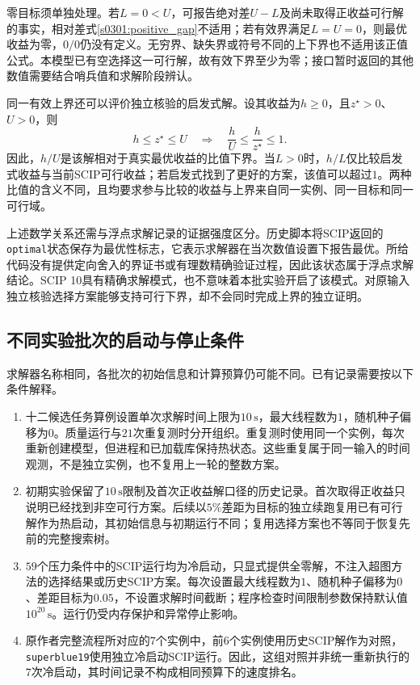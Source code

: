 零目标须单独处理。若$L=0<U$，可报告绝对差$U-L$及尚未取得正收益可行解的事实，相对差式\eqref{s0301:positive_gap}不适用；若有效界满足$L=U=0$，则最优收益为零，$0/0$仍没有定义。无穷界、缺失界或符号不同的上下界也不适用该正值公式。本模型已有空选择这一可行解，故有效下界至少为零；接口暂时返回的其他数值需要结合哨兵值和求解阶段辨认。

同一有效上界还可以评价独立核验的启发式解。设其收益为$h\geq0$，且$z^{\star}>0$、$U>0$，则
\begin{equation}
 h\leq z^{\star}\leq U
 \quad\Longrightarrow\quad
 \frac{h}{U}\leq\frac{h}{z^{\star}}\leq1.
\label{s0301:heuristic_ratio}
\end{equation}
因此，$h/U$是该解相对于真实最优收益的比值下界。当$L>0$时，$h/L$仅比较启发式收益与当前SCIP可行收益；若启发式找到了更好的方案，该值可以超过$1$。两种比值的含义不同，且均要求参与比较的收益与上界来自同一实例、同一目标和同一可行域。

上述数学关系还需与浮点求解记录的证据强度区分。历史脚本将SCIP返回的\texttt{optimal}状态保存为最优性标志，它表示求解器在当次数值设置下报告最优。所给代码没有提供定向舍入的界证书或有理数精确验证过程，因此该状态属于浮点求解结论。SCIP 10具有精确求解模式，也不意味着本批实验开启了该模式。对原输入独立核验选择方案能够支持可行下界，却不会同时完成上界的独立证明。

\subsection{不同实验批次的启动与停止条件}

求解器名称相同，各批次的初始信息和计算预算仍可能不同。已有记录需要按以下条件解释。

\begin{enumerate}
 \item 十二候选任务算例设置单次求解时间上限为$10\,\mathrm{s}$，最大线程数为$1$，随机种子偏移为$0$。质量运行与$21$次重复测时分开组织。重复测时使用同一个实例，每次重新创建模型，但进程和已加载库保持热状态。这些重复属于同一输入的时间观测，不是独立实例，也不复用上一轮的整数方案。
 \item 初期实验保留了$10\,\mathrm{s}$限制及首次正收益解口径的历史记录。首次取得正收益只说明已经找到非空可行方案。后续以$5\%$差距为目标的独立续跑复用已有可行解作为热启动，其初始信息与初期运行不同；复用选择方案也不等同于恢复先前的完整搜索树。
 \item $59$个压力条件中的SCIP运行均为冷启动，只显式提供全零解，不注入超图方法的选择结果或历史SCIP方案。每次设置最大线程数为$1$、随机种子偏移为$0$、差距目标为$0.05$，不设置求解时间截断；程序检查时间限制参数保持默认值$10^{20}\,\mathrm{s}$。运行仍受内存保护和异常停止影响。
 \item 原作者完整流程所对应的$7$个实例中，前$6$个实例使用历史SCIP解作为对照，\texttt{superblue19}使用独立冷启动SCIP运行。因此，这组对照并非统一重新执行的$7$次冷启动，其时间记录不构成相同预算下的速度排名。
\end{enumerate}

